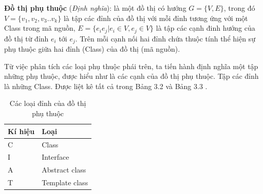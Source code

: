 \documentclass[12pt]{report}
\begin{document}
\noindent \textbf{Đồ thị phụ thuộc} (\textit{Định nghĩa}): là một đồ thị có hướng $G = \{V,E \}$, trong đó $V = \{v_1,v_2,v_3..v_k\}$ là tập các đỉnh của đồ thị với mỗi đỉnh tương ứng với một Class trong mã nguồn, $E = \{ e_ie_j | e_i \in V, e_j \in V  \}$ là tập các cạnh đinh hướng của đồ thị từ đỉnh $e_i$ tới $e_j$. Trên mỗi cạnh nối hai đỉnh chứa thuộc tính thể hiện sự phụ thuộc giữa hai đỉnh (Class) của đồ thị (mã nguồn).

\noindent Từ việc phân tích các loại phụ thuộc phái trên, ta tiến hành định nghĩa một tập những phụ thuộc, được hiểu như là các cạnh của đồ thị phụ thuộc. Tập các đỉnh là những Class. Được liệt kê tất cả trong Bảng 3.2 và Bảng 3.3 \cite{orucc2016}.
\begin{table}[!htbp]
	\vspace{-0.5cm}
	\centering
	\caption{Các loại đỉnh của đồ thị phụ thuộc}
	\vspace{0.2cm}
	\label{tbl:java-class-type}
	\renewcommand{\arraystretch}{0.8}
	\begin{tabular}{|p{2.7cm}|p{8.7cm}|}
		\hline
		\textbf{Kí hiệu} & \textbf{Loại} \\ \hline
		C				& Class\\ \hline
		I				& Interface \\ \hline
		A				& Abstract class \\ \hline
		T				& Template class \\ \hline         
	\end{tabular}
\end{table}
\end{document}
